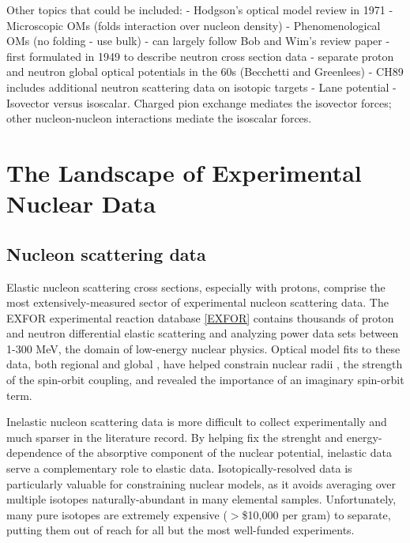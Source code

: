 
Other topics that could be included:
- Hodgson's optical model review in 1971
- Microscopic OMs (folds interaction over nucleon density)
- Phenomenological OMs (no folding - use bulk)
- can largely follow Bob and Wim's review paper
- first formulated in 1949 to describe neutron cross section data
- separate proton and neutron global optical potentials in the 60s (Becchetti
and Greenlees)
- CH89 includes additional neutron scattering data on isotopic targets
- Lane potential 
- Isovector versus isoscalar. Charged pion exchange mediates the isovector forces;
other nucleon-nucleon interactions mediate the isoscalar forces.

\section{The Landscape of Experimental Nuclear Data}

\subsection{Nucleon scattering data}
Elastic nucleon scattering cross sections, especially with protons, comprise the most extensively-measured
sector of experimental nucleon scattering data. The EXFOR experimental reaction database
\ref{EXFOR} contains thousands of proton and neutron differential elastic scattering and analyzing
power data sets between 1-300 MeV, the domain of low-energy nuclear physics. Optical model fits
to these data, both regional and global \cite{CH89, KoningDelaroche}, have helped
constrain nuclear radii \cite{radiusExample}, the strength of the spin-orbit coupling,
and revealed the importance of an imaginary spin-orbit term.

Inelastic nucleon scattering data is more difficult to collect experimentally and much sparser in
the literature record. By helping fix the strenght and energy-dependence of the absorptive component
of the nuclear potential, inelastic data serve a complementary role to elastic data.
Isotopically-resolved data is particularly valuable for constraining nuclear
models, as it avoids averaging over multiple isotopes naturally-abundant in many elemental samples.
Unfortunately, many pure isotopes are extremely expensive ($>$\$10,000 per gram) to
separate, putting them out of reach for all but the most well-funded experiments.

